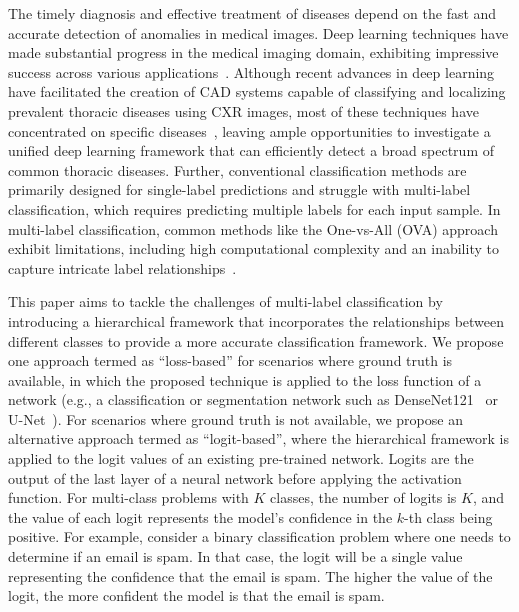 \documentclass[review,1p,times,numbers]{elsarticle}
\begin{document}
The timely diagnosis and effective treatment of diseases depend on the fast and accurate detection of anomalies in medical images. Deep learning techniques have made substantial progress in the medical imaging domain, exhibiting impressive success across various applications~\cite{litjens_Survey_2017a,eshghali_Machine_2023}.  Although recent advances in deep learning have facilitated the creation of CAD systems capable of classifying and localizing prevalent thoracic diseases using CXR images, most of these techniques have concentrated on specific diseases~\cite{jaiswal_Identifying_2019,lakhani_Deep_2017,pasa_Efficient_2019,ausawalaithong_Automatic_2018}, leaving ample opportunities to investigate a unified deep learning framework that can efficiently detect a broad spectrum of common thoracic diseases. Further, conventional classification methods are primarily designed for single-label predictions and struggle with multi-label classification, which requires predicting multiple labels for each input sample. In multi-label classification, common methods like the One-vs-All (OVA) approach exhibit limitations, including high computational complexity and an inability to capture intricate label relationships~\cite{tsoumakas_MultiLabel_2007}.

This paper aims to tackle the challenges of multi-label classification by introducing a hierarchical framework that incorporates the relationships between different classes to provide a more accurate classification framework. We propose one approach termed as ``loss-based'' for scenarios where ground truth is available, in which the proposed technique is applied to the loss function of a network (e.g., a classification or segmentation network such as DenseNet121~\cite{huang_Densely_2017} or U-Net~\cite{ronneberger_UNet_2015}). For scenarios where ground truth is not available, we propose an alternative approach termed as ``logit-based'', where the hierarchical framework is applied to the logit values of an existing pre-trained network. Logits are the output of the last layer of a neural network before applying the activation function. For multi-class problems with $K$ classes, the number of logits is $K$, and the value of each logit represents the model's confidence in the $k$-th class being positive. For example, consider a binary classification problem where one needs to determine if an email is spam. In that case, the logit will be a single value representing the confidence that the email is spam. The higher the value of the logit, the more confident the model is that the email is spam.
\end{document}
